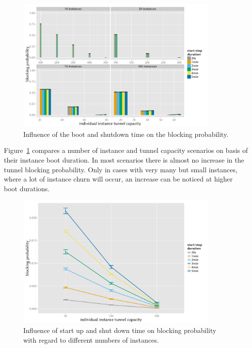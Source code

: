\begin{figure}[htb]
	\centering
	\includegraphics[width=0.9\textwidth]{images/R-virtualized-startstop-blocking-barchart.pdf}
	\caption{Influence of the boot and shutdown time on the blocking probability.}
\label{c4:fig:blockprob-startstop-barchart}
\end{figure}

Figure~\ref{c4:fig:blockprob-startstop-barchart} compares a number of instance and tunnel capacity scenarios on basis of their instance boot duration. In most scenarios there is almost no increase in the tunnel blocking probability. Only in cases with very many but small instances, where a lot of instance churn will occur, an increase can be noticed at higher boot durations.

\begin{figure}[htbp]
	\centering
	\includegraphics[width=0.9\textwidth]{images/compare-maxinstances-block.pdf}
	\caption{Influence of start up and shut down time on blocking probability with regard to different numbers of instances.}
\label{c4:fig:compare_maxinstances_block}
\end{figure}

